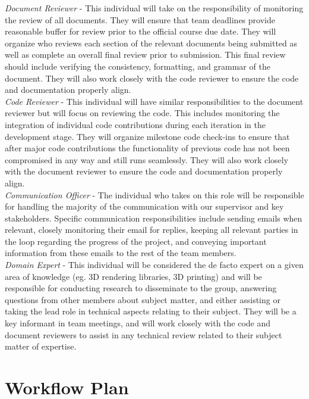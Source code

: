 \documentclass{article}
\begin{document}
\textit{Document Reviewer} - This individual will take on the responsibility of monitoring the review of all
documents. They will ensure that team deadlines provide reasonable buffer for review prior to the official course
due date. They will organize who reviews each section of the relevant documents being submitted as well as complete
an overall final review prior to submission. This final review should include verifying the consistency,
formatting, and grammar of the document. They will also work closely with the code reviewer to ensure the code and
documentation properly align.\\

\textit{Code Reviewer} - This individual will have similar responsibilities to the document reviewer but will focus
on reviewing the code. This includes monitoring the integration of individual code contributions during each
iteration in the development stage. They will organize milestone code check-ins to ensure that after major code
contributions the functionality of previous code has not been compromised in any way and still runs seamlessly. They
will also work closely with the document reviewer to ensure the code and documentation properly align.\\

\textit{Communication Officer} - The individual who takes on this role will be responsible for handling the majority
of the communication with our supervisor and key stakeholders. Specific communication responsibilities include
sending emails when relevant, closely monitoring their email for replies, keeping all relevant parties in the loop
regarding the progress of the project, and conveying important information from these emails to the rest of the team
members.\\

\textit{Domain Expert} - This individual will be considered the de facto expert on a given area of knowledge (eg. 
3D rendering libraries, 3D printing) and will be responsible for conducting research to disseminate to the group, answering questions
from other members about subject matter, and either assisting or taking the lead role in technical aspects relating to 
their subject. They will be a key informant in team meetings, and will work closely with the code and document reviewers
to assist in any technical review related to their subject matter of expertise.

\section{Workflow Plan}
\end{document}
